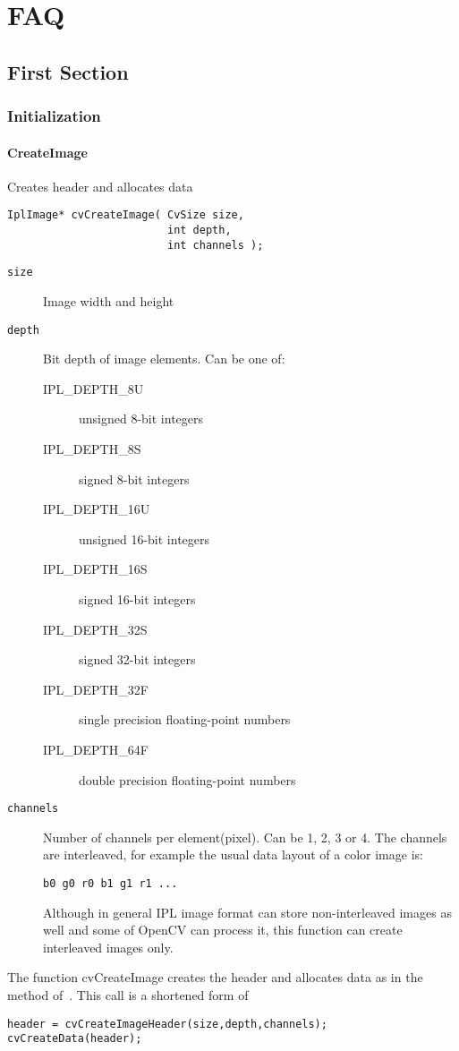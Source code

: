\chapter{FAQ}
\section{First Section}
\subsection{Initialization}

\subsubsection*{CreateImage}

Creates header and \textsf{allocates} data

\begin{shaded}
\begin{verbatim}
IplImage* cvCreateImage( CvSize size,
                         int depth,
                         int channels );
\end{verbatim}
\end{shaded}

\begin{description}
\item[\texttt{size}] Image width and height
\item[\texttt{depth}] Bit depth of image elements.  Can be one of:
\begin{description}
\item[IPL\_DEPTH\_8U] unsigned 8-bit integers
\item[IPL\_DEPTH\_8S] signed 8-bit integers
\item[IPL\_DEPTH\_16U] unsigned 16-bit integers
\item[IPL\_DEPTH\_16S] signed 16-bit integers
\item[IPL\_DEPTH\_32S] signed 32-bit integers
\item[IPL\_DEPTH\_32F] single precision floating-point numbers
\item[IPL\_DEPTH\_64F] double precision floating-point numbers
\end{description}
\item[\texttt{channels}] Number of channels per element(pixel). Can be 1, 2, 3 or 4. The channels are interleaved, for example the usual data layout of a color image is:
\begin{lstlisting}
b0 g0 r0 b1 g1 r1 ...
\end{lstlisting}
Although in general IPL image format can store non-interleaved images as well and some of OpenCV can process it, this function can create interleaved images only.

\end{description}

The function cvCreateImage creates the header and allocates data as in the method of~\cite{author_conf_year}.  This call is a shortened form of 
\begin{lstlisting}
header = cvCreateImageHeader(size,depth,channels);
cvCreateData(header);
\end{lstlisting}

